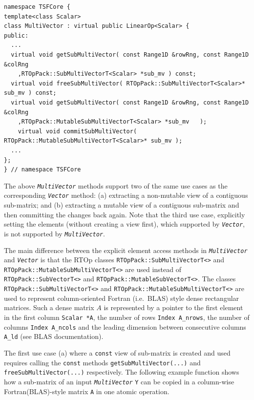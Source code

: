 {\scriptsize\begin{verbatim}
namespace TSFCore {
template<class Scalar>
class MultiVector : virtual public LinearOp<Scalar> {
public:
  ...
  virtual void getSubMultiVector( const Range1D &rowRng, const Range1D &colRng
    ,RTOpPack::SubMultiVectorT<Scalar> *sub_mv ) const;
  virtual void freeSubMultiVector( RTOpPack::SubMultiVectorT<Scalar>* sub_mv ) const;
  virtual void getSubMultiVector( const Range1D &rowRng, const Range1D &colRng
    ,RTOpPack::MutableSubMultiVectorT<Scalar> *sub_mv	);
	virtual void commitSubMultiVector( RTOpPack::MutableSubMultiVectorT<Scalar>* sub_mv );
  ...
};
} // namespace TSFCore
\end{verbatim}}

The above {}\texttt{\textit{Multi\-Vector}} methods support two of the
same use cases as the corresponding {}\texttt{\textit{Vector}}
method: (a) extracting a non-mutable view of a contiguous sub-matrix;
and (b) extracting a mutable view of a contiguous sub-matrix and then
committing the changes back again.  Note that the third use case,
explicitly setting the elements (without creating a view first), which
supported by {}\texttt{\textit{Vector}}, is not supported by
{}\texttt{\textit{Multi\-Vector}}.

The main difference between the explicit element access methods in
{}\texttt{\textit{Multi\-Vector}} and {}\texttt{\textit{Vector}} is
that the RTOp classes {}\texttt{RTOpPack::\-SubMultiVectorT<>} and
{}\texttt{RTOpPack::\-MutableSubMultiVectorT<>} are used instead of
{}\texttt{RTOpPack::\-SubVectorT<>} and
{}\texttt{RTOpPack::\-MutableSubVectorT<>}.  The classes
{}\texttt{RTOpPack::\-SubMultiVectorT<>} and
{}\texttt{RTOpPack::\-MutableSubMultiVectorT<>} are used to represent
column-oriented Fortran (i.e.~BLAS) style dense rectangular matrices.
Such a dense matrix $A$ is represented by a pointer to the first
element in the first column {}\texttt{Scalar *A}, the number of rows
{}\texttt{Index A\_nrows}, the number of columns {}\texttt{Index
A\_ncols} and the leading dimension between consecutive columns
{}\texttt{A\_ld} (see BLAS documentation).

The first use case (a) where a {}\texttt{const} view of sub-matrix is
created and used requires calling the {}\texttt{const} methods
{}\texttt{get\-Sub\-Multi\-Vector(...)} and
{}\texttt{free\-Sub\-Multi\-Vector(...)}  respectively.  The following
example function shows how a sub-matrix of an input
{}\texttt{\textit{Multi\-Vector}} {}\texttt{Y} can be copied in a
column-wise Fortran(BLAS)-style matrix {}\texttt{A} in one atomic
operation.

